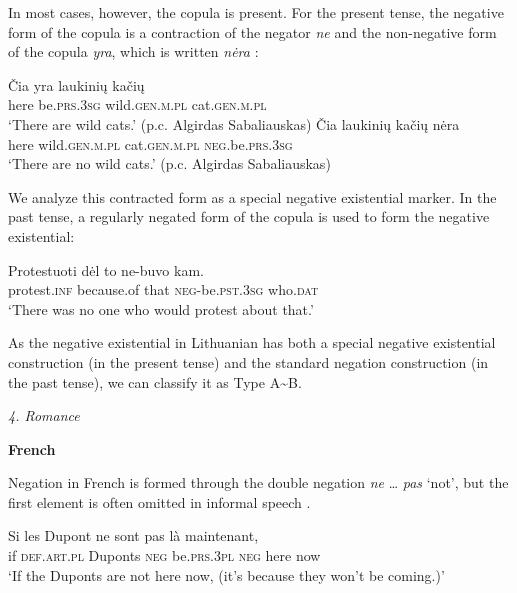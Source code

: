 \documentclass[output=paper]{langsci/langscibook}
\begin{document}
\begin{unindented}
In most cases, however, the copula is present. For the present tense, the negative form of the copula is a contraction of the negator \textit{ne} and the non-negative form of the copula \textit{yra}, which is written \textit{nėra} \citep[1976]{Mathiassen1996}:
%
\begin{exe}\ex \gll Čia yra laukinių kačių \\
here be.\textsc{prs.3sg} wild.\textsc{gen.m.pl} cat.\textsc{gen.m.pl} \\
    \glt `There are wild cats.' (p.c. Algirdas Sabaliauskas)
\ex \gll Čia laukinių kačių nėra \\
here  wild.\textsc{gen.m.pl} cat.\textsc{gen.m.pl} \textsc{neg}.be.\textsc{prs.3sg} \\
    \glt `There are no wild cats.' (p.c. Algirdas Sabaliauskas)
    \end{exe}

We analyze this contracted form as a special negative existential marker. In the past tense, a regularly negated form of the copula is used to form the negative existential:
%
\begin{exe}\ex \gll Protestuoti dėl to ne-buvo kam. \\
protest.\textsc{inf} because.of that \textsc{neg}-be.\textsc{pst.3sg} who.\textsc{dat} \\
    \glt `There was no one who would protest about that.' \parencite[134]{Kaledaite2008}
    \end{exe}

As the negative existential in Lithuanian has both a special negative existential construction (in the present tense) and the standard negation construction (in the past tense), we can classify it as Type A{\textasciitilde}B.

\textit{4. Romance}

\textbf{French}

Negation in French is formed through the double negation \textit{ne} …
\textit{pas} `not', but the first element is often omitted in informal
speech \parencite[219]{LangPerez2004}.
%
\begin{exe}\ex \gll Si les Dupont ne sont pas là maintenant, \\
if  \textsc{def.art.pl} Duponts \textsc{neg} be.\textsc{prs.3pl} \textsc{neg} here now \\
    \glt `If the Duponts are not here now, (it's because they won't be coming.)’ \parencite[219]{LangPerez2004}
    \end{exe}


\end{unindented}
\end{document}

